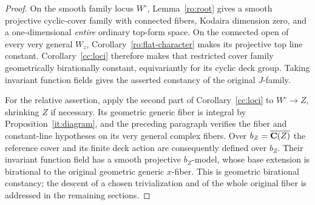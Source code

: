 \begin{proof}
On the smooth family locus $W^\circ$, Lemma~\ref{ro:root} gives a
smooth projective cyclic-cover family with connected fibers,
Kodaira dimension zero, and a one-dimensional \emph{entire}
ordinary top-form space. On the connected open of every very general
$W_z$, Corollary~\ref{ro:flat-character} makes its projective top line
constant. Corollary~\ref{cc:loci} therefore makes that restricted
cover family geometrically birationally constant, equivariantly for
its cyclic deck group. Taking invariant function fields gives the
asserted constancy of the original $J$-family.

For the relative assertion, apply the second part of
Corollary~\ref{cc:loci} to $W^\circ\to Z$, shrinking $Z$ if necessary.
Its geometric generic fiber is integral by
Proposition~\ref{it:diagram}, and the preceding paragraph verifies
the fiber and constant-line hypotheses on its very general complex
fibers. Over $b_Z=\overline{\mathbf C(Z)}$ the reference cover and its finite
deck action are consequently defined over $b_Z$. Their invariant
function field has a smooth projective $b_Z$-model, whose base
extension is birational to the original geometric generic $x$-fiber.
This is geometric birational constancy; the descent of a chosen
trivialization and of the whole original fiber is addressed in the
remaining sections.
\end{proof}
